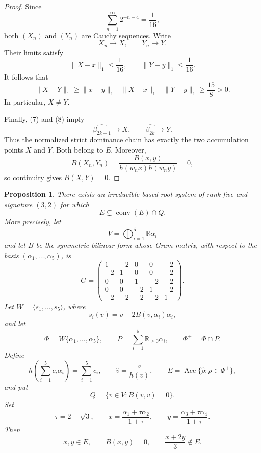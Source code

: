 \documentclass[11pt,reqno]{amsart}
\theoremstyle{plain}
\newtheorem{proposition}[theorem]{Proposition}
\theoremstyle{definition}
\theoremstyle{remark}
\numberwithin{equation}{section}
\begin{document}
\begin{proof}
Since
\[
\sum_{n=1}^{\infty}2^{-n-4}=\frac1{16},
\]
both $(X_n)$ and $(Y_n)$ are Cauchy sequences. Write
\[
X_n\longrightarrow X,\qquad Y_n\longrightarrow Y.
\]
Their limits satisfy
\[
\|X-x\|_1\leq\frac1{16},
\qquad
\|Y-y\|_1\leq\frac1{16}.
\]
It follows that
\[
\|X-Y\|_1
\geq\|x-y\|_1-\|X-x\|_1-\|Y-y\|_1
\geq\frac{15}{8}>0.
\]
In particular, $X\neq Y$.

Finally, (7) and (8) imply
\[
\widehat{\beta_{2k-1}}\longrightarrow X,
\qquad
\widehat{\beta_{2k}}\longrightarrow Y.
\]
Thus the normalized strict dominance chain has exactly the two
accumulation points $X$ and $Y$. Both belong to $E$. Moreover,
\[
B(X_n,Y_n)
=\frac{B(x,y)}{h(w_nx)h(w_ny)}=0,
\]
so continuity gives $B(X,Y)=0$.
\end{proof}

\begin{proposition}\label{prop:counterexample-convE-Q}
There exists an irreducible based root system of rank five and
signature $(3,2)$ for which
\[
E \subsetneq \operatorname{conv}(E)\cap Q.
\]
More precisely, let
\[
V=\bigoplus_{i=1}^{5}\mathbb{R}\alpha_i
\]
and let $B$ be the symmetric bilinear form whose Gram matrix,
with respect to the basis $(\alpha_1,\ldots,\alpha_5)$, is
\[
G=
\begin{pmatrix}
1&-2&0&0&-2\\
-2&1&0&0&-2\\
0&0&1&-2&-2\\
0&0&-2&1&-2\\
-2&-2&-2&-2&1
\end{pmatrix}.
\]
Let $W=\langle s_1,\ldots,s_5\rangle$, where
\[
s_i(v)=v-2B(v,\alpha_i)\alpha_i,
\]
and let
\[
\Phi=W\{\alpha_1,\ldots,\alpha_5\},
\qquad
P=\sum_{i=1}^{5}\mathbb{R}_{\geq 0}\alpha_i,
\qquad
\Phi^+=\Phi\cap P.
\]
Define
\[
h\left(\sum_{i=1}^{5}c_i\alpha_i\right)=\sum_{i=1}^{5}c_i,
\qquad
\widehat{v}=\frac{v}{h(v)},
\qquad
E=\operatorname{Acc}\{\widehat{\rho}:\rho\in\Phi^+\},
\]
and put
\[
Q=\{v\in V:B(v,v)=0\}.
\]
Set
\[
\tau=2-\sqrt{3},
\qquad
x=\frac{\alpha_1+\tau\alpha_2}{1+\tau},
\qquad
y=\frac{\alpha_3+\tau\alpha_4}{1+\tau}.
\]
Then
\[
x,y\in E,
\qquad
B(x,y)=0,
\qquad
\frac{x+2y}{3}\notin E.
\]
\end{proposition}
\end{document}
